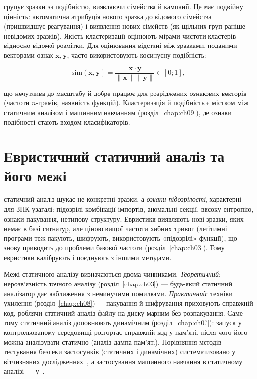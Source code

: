  групує зразки за подібністю, виявляючи сімейства й кампанії. Це має подвійну цінність: автоматична атрибуція нового зразка до відомого сімейства (пришвидшує реагування) і виявлення нових сімейств (як щільних груп раніше невідомих зразків). Якість кластеризації оцінюють мірами чистоти кластерів відносно відомої розмітки. Для оцінювання відстані між зразками, поданими векторами ознак $\mathbf{x}, \mathbf{y}$, часто використовують косинусну подібність:

\begin{equation}
\mathrm{sim}(\mathbf{x},\mathbf{y}) = \frac{\mathbf{x}\cdot\mathbf{y}}{\|\mathbf{x}\|\,\|\mathbf{y}\|} \in [0;1],
\label{eq:ch06-cosine}
\end{equation}

що нечутлива до масштабу й добре працює для розріджених ознакових векторів (частоти $n$-грамів, наявність функцій). Кластеризація й подібність є містком між статичним аналізом і машинним навчанням (розділ~\ref{chap:ch09}), де ознаки подібності стають входом класифікаторів.

\section{Евристичний статичний аналіз та його межі}\label{sec:ch06-heuristics}

 статичний аналіз шукає не конкретні зразки, а \emph{ознаки підозрілості}, характерні для ЗПК узагалі: підозрілі комбінації імпортів, аномальні секції, високу ентропію, ознаки пакування, нетипову структуру. Евристики виявляють нові зразки, яких немає в базі сигнатур, але ціною вищої частоти хибних тривог (легітимні програми теж пакують, шифрують, використовують «підозрілі» функції), що знову приводить до проблеми базової частоти (розділ~\ref{chap:ch03}). Тому евристики калібрують і поєднують з іншими методами.

Межі статичного аналізу визначаються двома чинниками. \emph{Теоретичний}: нерозв'язність точного аналізу (розділ~\ref{chap:ch03}) --- будь-який статичний аналізатор дає наближення з неминучими помилками. \emph{Практичний}: техніки ухилення (розділ~\ref{chap:ch08}) --- пакування й шифрування приховують справжній код, роблячи статичний аналіз файлу на диску марним без розпакування. Саме тому статичний аналіз доповнюють динамічним (розділ~\ref{chap:ch07}): запуск у контрольованому середовищі розгортає справжній код у пам'яті, після чого його можна аналізувати статично (аналіз дампа пам'яті). Порівняння методів тестування безпеки застосунків (статичних і динамічних) систематизовано у вітчизняних дослідженнях~\cite{ch06:sast}, а застосування машинного навчання в статичному аналізі --- у~\cite{ch03:opirskyi-ml}.

